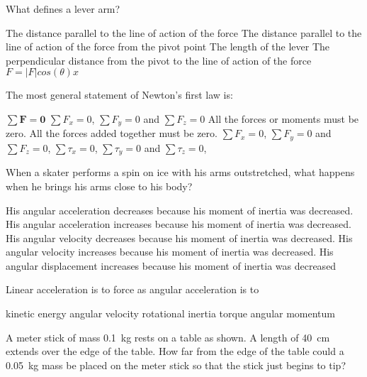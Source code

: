 \documentclass{../../../oss-ap12ibhl-print}
\begin{document}
\genheader


\begin{questions}

  \question What defines a lever arm?
  \begin{choices}
    \choice The distance parallel to the line of action of the force
    \choice The distance parallel to the line of action of the force from the
    pivot point
    \choice The length of the lever
    \choice The perpendicular distance from the pivot to the line of action of
    the force
    \choice $F = |F|cos(\theta)x$
  \end{choices}
    
  \question The most general statement of Newton's first law is:
  \begin{choices}
    \choice $\sum\bm{F}=\bm{0}$
    \choice $\sum F_x=0$, $\sum F_y=0$ and $\sum F_z=0$
    \choice All the forces or moments must be zero.
    \choice All the forces added together must be zero.
    \choice $\sum F_x=0$, $\sum F_y=0$ and $\sum F_z=0$, $\sum\tau_x=0$,
    $\sum\tau_y=0$ and $\sum\tau_z=0$,
  \end{choices}

  \question When a skater performs a spin on ice with his arms outstretched,
  what happens when he brings his arms close to his body?
  \begin{choices}
    \choice His angular acceleration decreases because his moment of inertia
    was decreased.
    \choice His angular acceleration increases because his moment of inertia
    was decreased.
    \choice His angular velocity decreases because his moment of inertia was
    decreased.
    \choice His angular velocity increases because his moment of inertia was
    decreased.
    \choice His angular displacement increases because his moment of inertia
    was decreased
  \end{choices}
    
  \question Linear acceleration is to force as angular acceleration is to
  \begin{choices}
    \choice kinetic energy
    \choice angular velocity
    \choice rotational inertia
    \choice torque
    \choice angular momentum
  \end{choices}
  
  \question A meter stick of mass \SI{.1}{\kilo\gram} rests on a table as
  shown. A length of \SI{40}{\centi\metre} extends over the edge of the table.
  How far from the edge of the table could a \SI{.05}{\kilo\gram} mass be
  placed on the meter stick so that the stick just begins to tip?


\end{questions}
\end{document}
